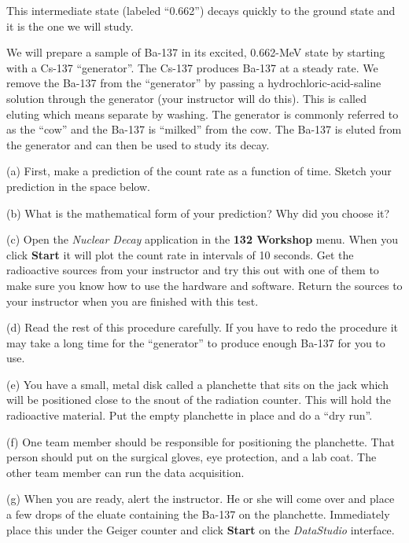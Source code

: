 This intermediate state (labeled ``0.662'') decays quickly to the ground state and
it is the one we will study.

We will prepare a sample of Ba-137 in its excited, 0.662-MeV state 
by starting with a Cs-137 ``generator''.
The Cs-137 produces
Ba-137 at a steady rate. We remove the Ba-137 from the ``generator''
by passing a hydrochloric-acid-saline solution through the generator
(your instructor will do this). This is called eluting which means separate by
washing. The generator is commonly referred to as the ``cow''
and the Ba-137 is ``milked'' from the cow.
The Ba-137 is eluted from the generator and can then be used to study its
decay.


(a) First, make a prediction of the count rate as a function of time.
Sketch your prediction in the space below.

\vspace{1.5in}

(b) What is the mathematical form of your prediction? Why did you choose it?

\vspace{1.5in}

(c) Open the {\it Nuclear Decay} application in the {\bf 132 Workshop} menu. 
When you click {\bf Start}
it will plot the count rate in intervals of 10 seconds.
Get the radioactive sources from your instructor and
try this out with one of them
to make sure you know how to use the hardware and software.
Return the sources to your instructor when you are finished with this test.

(d) Read the rest of this procedure carefully. 
If you have to redo the procedure it may take a long time for the ``generator'' to
produce enough Ba-137 for you to use.

(e) You have a small, metal disk called a planchette that sits on the 
jack which will be positioned close to the snout of the radiation counter.
This will hold the radioactive material.
Put the empty planchette in place and do a ``dry run''.

(f) One team member should be responsible for positioning the planchette.
That person should put on the surgical gloves, eye protection, and a lab coat.
The other team member can run the data acquisition.

(g) When you are ready, alert the instructor. He or she will come over and place 
a few drops of the eluate containing the Ba-137 on the planchette.
Immediately place this under the Geiger counter and
click {\bf Start} on the {\it DataStudio} interface.

